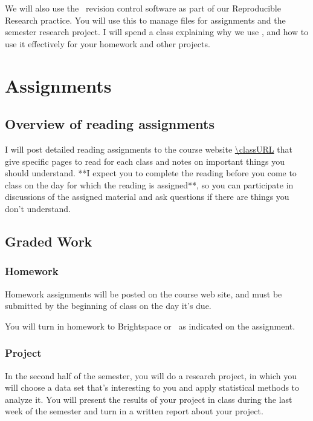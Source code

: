\documentclass[11pt,twoside]{jgsyllabus}\usepackage[]{graphicx}\usepackage[]{xcolor}
\begin{document}
We will also use the \git\ revision control software as part of our
Reproducible Research practice. You will use this to manage files
for assignments and the semester research project.
I will spend a class explaining why we use \git, and how
to use it effectively for your homework and other projects.

\section{Assignments}

\subsection[Reading assignments]{Overview of reading assignments}

I will post detailed reading assignments to the course website
\url{\classURL}
that give specific pages to read for each class
and notes on important things you should understand.
**I expect you to complete the reading before you come to class on the day
for which the reading is assigned**,
so you can participate in discussions of the
assigned material and ask questions if there are things you don't understand.

\subsection{Graded Work}

\subsubsection{Homework}

Homework assignments will be posted on the course web site, and must be
submitted by the beginning of class on the day it's due.

You will turn in homework to Brightspace or \GitHub\ as indicated on the
assignment.

\subsubsection{Project}

In the second half of the semester, you will do a research project, in which you
will choose a data set that's interesting to you and apply statistical methods to
analyze it. You will present the results of your project in class during the
last week of the semester and turn in a written report about your project.
\end{document}
